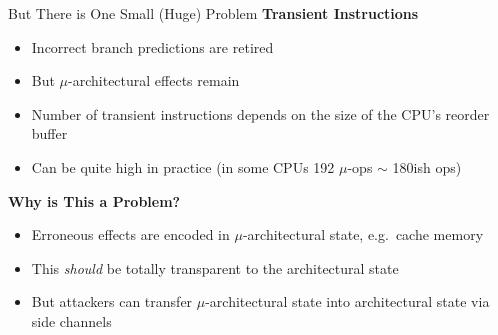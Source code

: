 \documentclass[10pt, dvipsnames, aspectratio=169]{beamer}
\begin{document}
\begin{frame}[c]{But There is One Small (Huge) Problem}{}
  {\bf Transient Instructions}
  \begin{itemize}
    \item Incorrect branch predictions are retired
    \item But $\mu$-architectural effects remain
    \item Number of transient instructions depends on the size of the CPU's reorder buffer
    \item Can be quite high in practice (in some CPUs 192 $\mu$-ops $\sim$ 180ish ops)
  \end{itemize}

  \vfill
  {\bf Why is This a Problem?}
  \begin{itemize}
    \item Erroneous effects are encoded in $\mu$-architectural state, e.g.~cache memory
    \item This \textit{should} be totally transparent to the architectural state
    \item But attackers can transfer $\mu$-architectural state into architectural state via side channels
  \end{itemize}


\end{frame}
\end{document}
